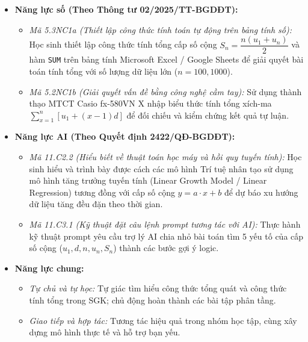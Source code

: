 \documentclass[12pt, a4paper]{article}
\begin{document}
\begin{itemize}[leftmargin=1.2cm]
    \item \textbf{Năng lực số (Theo Thông tư 02/2025/TT-BGDĐT):}  
    \begin{itemize}[leftmargin=0.6cm]  
        \item \textit{Mã 5.3NC1a (Thiết lập công thức tính toán tự động trên bảng tính số):} Học sinh thiết lập công thức tính tổng cấp số cộng $S_n = \dfrac{n(u_1 + u_n)}{2}$ và hàm \texttt{SUM} trên bảng tính Microsoft Excel / Google Sheets để giải quyết bài toán tính tổng với số lượng dữ liệu lớn ($n = 100, 1000$).  
        \item \textit{Mã 5.2NC1b (Giải quyết vấn đề bằng công nghệ cầm tay):} Sử dụng thành thạo MTCT Casio fx-580VN X nhập biểu thức tính tổng xích-ma $\sum_{x=1}^{n} [u_1 + (x - 1)d]$ để đối chiếu và kiểm chứng kết quả tự luận.  
    \end{itemize}  
  
    \item \textbf{Năng lực AI (Theo Quyết định 2422/QĐ-BGDĐT):}  
    \begin{itemize}[leftmargin=0.6cm]  
        \item \textit{Mã 11.C2.2 (Hiểu biết về thuật toán học máy và hồi quy tuyến tính):} Học sinh hiểu và trình bày được cách các mô hình Trí tuệ nhân tạo sử dụng mô hình tăng trưởng tuyến tính (Linear Growth Model / Linear Regression) tương đồng với cấp số cộng $y = a \cdot x + b$ để dự báo xu hướng dữ liệu tăng đều đặn theo thời gian.  
        \item \textit{Mã 11.C3.1 (Kỹ thuật đặt câu lệnh prompt tương tác với AI):} Thực hành kỹ thuật prompt yêu cầu trợ lý AI chia nhỏ bài toán tìm 5 yếu tố của cấp số cộng ($u_1, d, n, u_n, S_n$) thành các bước gợi ý logic.  
    \end{itemize}  
  
    \item \textbf{Năng lực chung:}  
    \begin{itemize}[leftmargin=0.6cm]  
        \item \textit{Tự chủ và tự học:} Tự giác tìm hiểu công thức tổng quát và công thức tính tổng trong SGK; chủ động hoàn thành các bài tập phân tầng.  
        \item \textit{Giao tiếp và hợp tác:} Tương tác hiệu quả trong nhóm học tập, cùng xây dựng mô hình thực tế và hỗ trợ bạn yếu.  
    \end{itemize}  
\end{itemize}  
  
\end{document}
